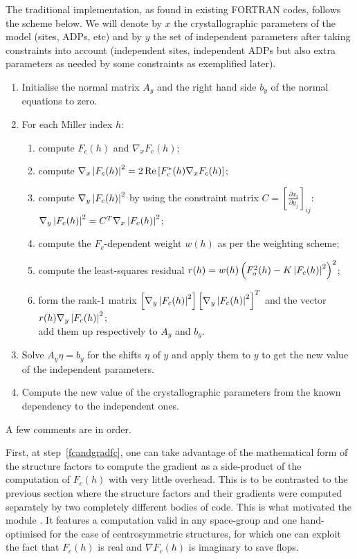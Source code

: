 \documentclass[12pt]{article}
\begin{document}
 The traditional implementation, as found in existing FORTRAN codes, follows the scheme below. We will denote by $x$ the crystallographic parameters of the model (sites, ADPs, etc) and by $y$ the set of independent parameters after taking constraints into account (independent sites, independent ADPs but also extra parameters as needed by some constraints as exemplified later).
 \begin{enumerate}
 \item Initialise the normal matrix $A_y$ and the right hand side $b_y$ of the normal equations to zero.
\item For each Miller index $h$: \label{bignormalmatrixloop}
\begin{enumerate}
\item compute $F_c(h)$ and $\nabla_x F_c(h)$;\label{fcandgradfc}
\item compute $\nabla_x \left| F_c(h) \right|^2 = 2\operatorname{Re}\left[F_c^*(h) \nabla_x F_c(h)\right]$;
\item compute $\nabla_y \left| F_c(h) \right|^2$ by using the constraint matrix $C=\left[\frac{\partial x_i}{\partial y_j}\right]_{ij}$: \\
$\nabla_y \left| F_c(h) \right|^2 = C^T \nabla_x \left| F_c(h) \right|^2$;
\item compute the $F_c$-dependent weight $w(h)$ as per the weighting scheme;
\item compute the least-squares residual $r(h) = w(h)\left(F_o^2(h) - K \left| F_c(h) \right|^2\right)^2$;
\item form the rank-1 matrix $\left[\nabla_y \left| F_c(h) \right|^2\right] \left[\nabla_y \left| F_c(h) \right|^2\right]^T$ and the vector $r(h) \nabla_y \left| F_c(h) \right|^2$;
\\ add them up respectively to $A_y$ and $b_y$.
\end{enumerate}
\item Solve $A_y \eta = b_y$ for the shifts $\eta$ of $y$ and apply them to $y$ to get the new value of the independent parameters.
\item Compute the new value of the crystallographic parameters from the known dependency to the independent ones.
\label{constrainedshifts}
\end{enumerate}
A few comments are in order. 

First, at step~\ref{fcandgradfc}, one can take advantage of the mathematical form of the structure factors to compute the gradient as a side-product of the computation of $F_c(h)$ with very little overhead. This is to be contrasted to the previous section where the structure factors and their gradients were computed separately by two completely different bodies of code. This is what motivated the module . It features a computation valid in any space-group and one hand-optimised for the case of centrosymmetric structures, for which one can exploit the fact that $F_c(h)$ is real and $\nabla F_c(h)$ is imaginary to save flops.
\end{document}
